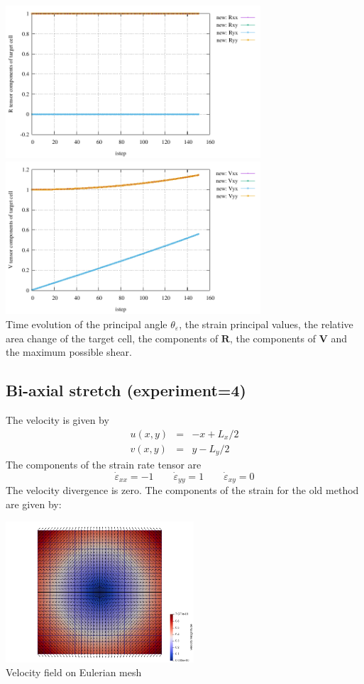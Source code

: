 \begin{center}
\includegraphics[width=9.5cm]{python_codes/fieldstone_89/results/pureshear/R.pdf}
\includegraphics[width=9.5cm]{python_codes/fieldstone_89/results/pureshear/V.pdf}\\
{\captionfont Time evolution of the principal angle $\theta_\varepsilon$, 
the strain principal values, the relative area change of the target cell, 
the components of ${\bm R}$, the components of ${\bm V}$ and the maximum
possible shear.}
\end{center}

\newpage
\subsection*{Bi-axial stretch (experiment=4)}

The velocity is given by
\begin{eqnarray}
u(x,y)&=&-x+L_x/2 \\
v(x,y)&=&y-L_y/2
\end{eqnarray}
The components of the strain rate tensor are
\[
\dot\varepsilon_{xx} = -1 
\qquad
\dot\varepsilon_{yy} = 1
\qquad
\dot\varepsilon_{xy} = 0 
\]
The velocity divergence is zero. The components of the strain for the old method are given by:




\begin{center}
\includegraphics[width=7cm]{python_codes/fieldstone_89/results/biaxial/vel}\\
{\captionfont Velocity field on Eulerian mesh}
\end{center}



